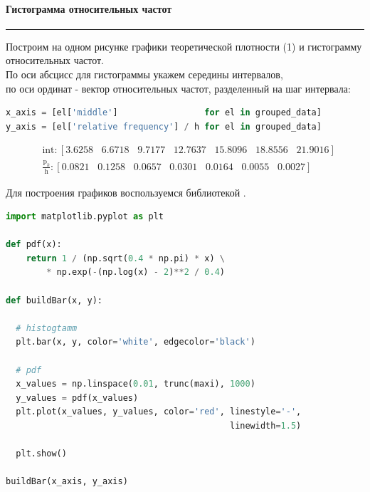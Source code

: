 \documentclass[a4paper, 14pt]{extarticle}
\begin{document}
\paragraph{Гистограмма относительных частот}\vspace{-20pt}\rule{\linewidth}{0.1mm}

Построим на одном рисунке графики теоретической плотности (1) и гистограмму относительных
частот. \\
По оси абсцисс для гистограммы укажем середины интервалов, \\
по оси ординат - вектор относительных частот, разделенный на шаг интервала: \\

\begin{center}
  \begin{lstlisting}[language=Python]
x_axis = [el['middle']                 for el in grouped_data]
y_axis = [el['relative frequency'] / h for el in grouped_data]
  \end{lstlisting}
\end{center}

\begin{align*}
  & \text{int}: [ 3.6258 \hspace{10pt} 6.6718  \hspace{10pt} 9.7177 \hspace{10pt} 12.7637 \hspace{10pt} 15.8096 \hspace{10pt} 18.8556 \hspace{10pt} 21.9016] \\
  & \frac{\text{p}_k}{\text{h}}: [0.0821  \hspace{10pt} 0.1258  \hspace{10pt} 0.0657 \hspace{10pt} 0.0301  \hspace{10pt} 0.0164  \hspace{10pt} 0.0055  \hspace{10pt} 0.0027]
\end{align*}

Для построения графиков воспользуемся библиотекой . \\

\begin{center}
  \begin{lstlisting}[language=Python]
import matplotlib.pyplot as plt

def pdf(x):
    return 1 / (np.sqrt(0.4 * np.pi) * x) \
        * np.exp(-(np.log(x) - 2)**2 / 0.4)

def buildBar(x, y):

  # histogtamm 
  plt.bar(x, y, color='white', edgecolor='black')

  # pdf
  x_values = np.linspace(0.01, trunc(maxi), 1000)
  y_values = pdf(x_values)
  plt.plot(x_values, y_values, color='red', linestyle='-', 
                                            linewidth=1.5)

  plt.show()

buildBar(x_axis, y_axis)
  \end{lstlisting}
\end{center}
\end{document}
